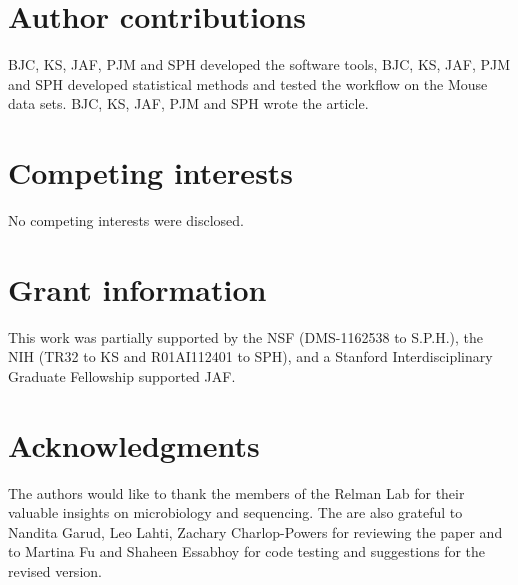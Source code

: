 \documentclass[9pt,a4paper]{extarticle}\usepackage[]{graphicx}\usepackage[]{color}
\begin{document}
\section*{Author contributions}
BJC, KS, JAF, PJM and SPH developed the software tools,
BJC, KS, JAF, PJM  and SPH developed statistical
methods and tested the workflow on the Mouse  data sets.
 BJC,  KS, JAF, PJM and SPH wrote the article.
\section*{Competing interests}
No competing interests were disclosed.

\section*{Grant information}
This work was partially supported by the NSF (DMS-1162538 to S.P.H.), the NIH (TR32 to KS and R01AI112401 to SPH), and a Stanford Interdisciplinary Graduate Fellowship supported JAF.

\section*{Acknowledgments}
The authors would like to thank the members of the Relman Lab for their valuable insights on microbiology and sequencing.
The are also grateful to Nandita Garud, Leo Lahti, Zachary Charlop-Powers for reviewing the paper and to
Martina Fu and Shaheen Essabhoy for
code testing and suggestions for the revised version.

{\small
}
\end{document}
